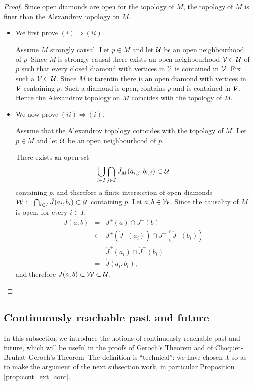 \documentclass[a4paper,twoside]{article}
\begin{document}
\begin{proof} Since open diamonds are open for the topology of $M$,
the topology of $M$ is finer than the Alexandrov topology on $M$.
\begin{itemize}
\item We first prove $(i)\Rightarrow (ii)$.

Assume $M$ strongly causal.
Let $p\in M$ and let $\mathcal{U}$ be an open neighbourhood of $p$. Since $M$ is strongly causal
there exists an open neighbourhood $\mathcal V\subset \mathcal{U}$ of $p$ such that every closed diamond with vertices in $\mathcal V$ is contained in
$\mathcal V$. Fix such a $\mathcal V\subset \mathcal{U}$. Since $M$ is tarentin there is an open diamond with vertices in $\mathcal V$
containing $p$. Such a diamond is open, contains $p$ and is contained in $\mathcal V$.
Hence the Alexandrov topology on $M$ coincides with the topology of $M$.
\item We now prove $(ii)\Rightarrow (i)$.

Assume that the Alexandrov topology coincides with the topology
of $M$.
Let $p\in M$ and let $\mathcal{U}$ be an open neighbourhood of $p$.

There exists an open set
$$ \bigcup_{i\in I}\bigcap_{j\in J} \ring{J}_M(a_{i,j},b_{i,j}) \subset \U$$
containing $p$, and therefore a finite intersection of open diamonds
$\W:=\bigcap_{i\in I}\ring{J}(a_i,b_i) \subset \U$ containing $p$.
Let $a,b\in \mathcal W$. Since the causality of $M$ is open, for every
$i\in I$,
\begin{eqnarray*}
J(a,b)&=& J^+(a)\cap J^-(b) \\
&\subset&J^+(\ring J^+(a_i)) \cap J^-(\ring J^-(b_i))\\
&=&\ring J^+(a_i)\cap \ring J^-(b_i)\\
&=&\ring J (a_i,b_i),
\end{eqnarray*}
and therefore $J(a,b)\subset \mathcal W\subset \mathcal{U}$.
\end{itemize}
\end{proof}

\subsection{Continuously reachable past and future}
In this subsection we introduce the notions of continuously reachable past and future, which will be useful
in the proofs of Geroch's Theorem and of Choquet-Bruhat--Geroch's Theorem.
The definition is ``technical'': we have chosen it so as to make the argument of the next subsection work,
in particular Proposition \ref{prop:cont_ext_cont}.
\end{document}
